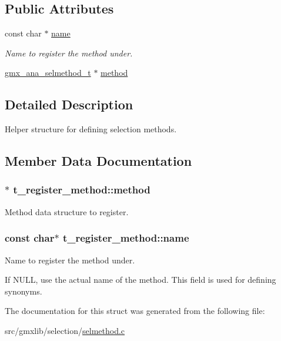 \subsection*{\-Public \-Attributes}
\begin{DoxyCompactItemize}
\item 
const char $\ast$ \hyperlink{structt__register__method_a5a061c3c743274792c6c692b8b60a21f}{name}
\begin{DoxyCompactList}\small\item\em \-Name to register the method under. \end{DoxyCompactList}\item 
\hyperlink{structgmx__ana__selmethod__t}{gmx\-\_\-ana\-\_\-selmethod\-\_\-t} $\ast$ \hyperlink{structt__register__method_a6cbae95d40126f4cfe12ddd880d98d33}{method}
\end{DoxyCompactItemize}


\subsection{\-Detailed \-Description}
\-Helper structure for defining selection methods. 

\subsection{\-Member \-Data \-Documentation}
\hypertarget{structt__register__method_a6cbae95d40126f4cfe12ddd880d98d33}{
\subsubsection[{method}]{$\ast$ {\bf t\-\_\-register\-\_\-method\-::method}}}\label{structt__register__method_a6cbae95d40126f4cfe12ddd880d98d33}
\-Method data structure to register. \hypertarget{structt__register__method_a5a061c3c743274792c6c692b8b60a21f}{
\subsubsection[{name}]{\setlength{\rightskip}{0pt plus 5cm}const char$\ast$ {\bf t\-\_\-register\-\_\-method\-::name}}}\label{structt__register__method_a5a061c3c743274792c6c692b8b60a21f}


\-Name to register the method under. 

\-If \-N\-U\-L\-L, use the actual name of the method. \-This field is used for defining synonyms. 

\-The documentation for this struct was generated from the following file\-:\begin{DoxyCompactItemize}
\item 
src/gmxlib/selection/\hyperlink{selmethod_8c}{selmethod.\-c}\end{DoxyCompactItemize}
